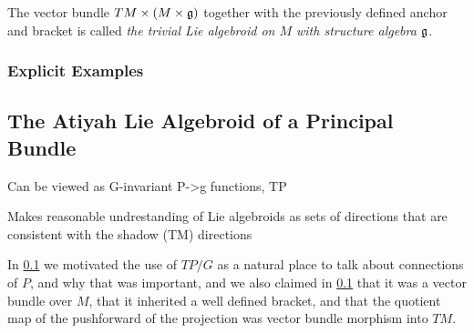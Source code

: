 The vector bundle $TM \times (M \times \mathfrak{g})$ together with the previously defined anchor and bracket is called \emph{the trivial Lie algebroid on $M$ with structure algebra $\mathfrak{g}$}.

\subsubsection{Explicit Examples}



\subsection{The Atiyah Lie Algebroid of a Principal Bundle}

Can be viewed as G-invariant P->g functions, TP 

Makes reasonable undrestanding of Lie algebroids as sets of directions that are consistent with the shadow (TM) directions

In \ref{} we motivated the use of $TP/G$ as a natural place to talk about connections of $P$, and why that was important, and we also claimed in \ref{} that it was a vector bundle over $M$, that it inherited a well defined bracket, and that the quotient map of the pushforward of the projection was vector bundle morphism into $TM$.

